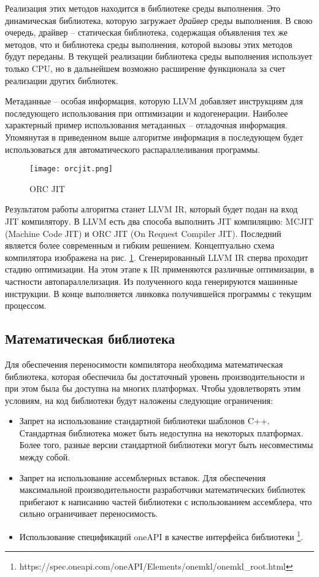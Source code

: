 Реализация этих методов находится в библиотеке среды выполнения. Это динамическая
библиотека, которую загружает \textit{драйвер} среды выполнения. В свою очередь,
драйвер -- статическая библиотека, содержащая объявления тех же методов, что и
библиотека среды выполнения, которой вызовы этих методов будут переданы.
В текущей реализации библиотека среды выполнения использует только CPU,
но в дальнейшем возможно расширение функционала за счет реализации других
библиотек.

Метаданные -- особая информация, которую LLVM добавляет инструкциям для
последующего использования при оптимизации и кодогенерации. Наиболее характерный
пример использования метаданных -- отладочная информация. Упомянутая в приведенном
выше алгоритме информация в последующем будет использоваться для автоматического
распараллеливания программы.

\begin{figure}[h]
    \centering
    \texttt{[image: orcjit.png]}
    \caption{ORC JIT}
    \label{fig:orcjit}
\end{figure}

Результатом работы алгоритма станет LLVM IR, который будет подан на вход
JIT компилятору. В LLVM есть два способа выполнить JIT компиляцию: MCJIT
(Machine Code JIT) и ORC JIT (On Request Compiler JIT). Последний является
более современным и гибким решением. Концептуально схема компилятора
изображена на рис. \ref{fig:orcjit}. Сгенерированный LLVM IR сперва проходит
стадию оптимизации. На этом этапе к IR применяются различные оптимизации, в
частности автопараллелизация. Из полученного кода генерируются машинные инструкции.
В конце выполняется линковка получившейся программы с текущим процессом.

\subsection{Математическая библиотека}

Для обеспечения переносимости компилятора необходима математическая библиотека,
которая обеспечила бы достаточный уровень производительности и при этом была
бы доступна на многих платформах. Чтобы удовлетворять этим условиям, на код
библиотеки будут наложены следующие ограничения:

\begin{itemize}
  \item Запрет на использование стандартной библиотеки шаблонов C++. Стандартная
    библиотека может быть недоступна на некоторых платформах. Более того, разные
    версии стандартной библиотеки могут быть несовместимы между собой.
  \item Запрет на использование ассемблерных вставок. Для обеспечения максимальной
    производительности разработчики математических библиотек прибегают к написанию
    частей библиотеки с использованием ассемблера, что сильно ограничивает переносимость.
  \item Использование спецификаций oneAPI в качестве интерфейса библиотеки
    \footnote{https://spec.oneapi.com/oneAPI/Elements/onemkl/onemkl\_root.html}.
\end{itemize}

